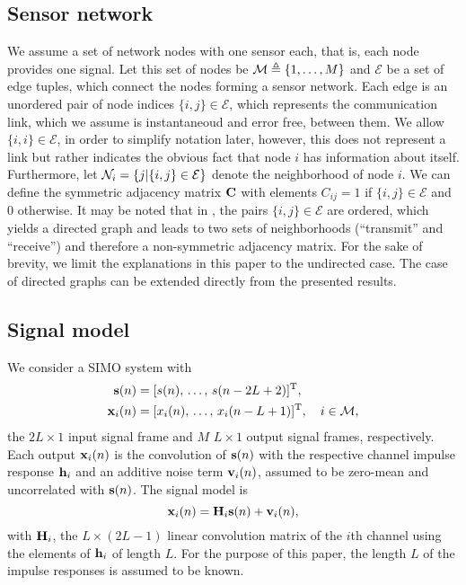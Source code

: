 \documentclass{article}
\begin{document}
\subsection[]{Sensor network}
We assume a set of network nodes with one sensor each, that is, each node provides one signal.
Let this set of nodes be \(\mathcal{M} \triangleq \{1,\ldots,M\}\) and \(\mathcal{E}\) be a set of edge tuples, which connect the nodes forming a sensor network.
Each edge is an unordered pair of node indices \(\{i,j\} \in \mathcal{E}\), which represents the communication link, which we assume is instantaneoud and error free, between them.
We allow \(\{i,i\} \in \mathcal{E}\), in order to simplify notation later, however, this does not represent a link but rather indicates the obvious fact that node \(i\) has information about itself.
Furthermore, let \(\mathcal{N}_i = \{j|\{i,j\} \in \mathcal{E}\}\) denote the neighborhood of node \(i\).
We can define the symmetric adjacency matrix \(\bm{\mathrm{C}}\) with elements \(C_{ij} = 1\) if \(\{i,j\} \in \mathcal{E}\) and 0 otherwise.
It may be noted that in \cite{blochbergerDBSI}, the pairs \(\{i,j\} \in \mathcal{E}\) are ordered, which yields a directed graph and leads to two sets of neighborhoods (``transmit'' and ``receive'') and therefore a non-symmetric adjacency matrix.
For the sake of brevity, we limit the explanations in this paper to the undirected case.
The case of directed graphs can be extended directly from the presented results.

\subsection[]{Signal model}
We consider a SIMO system with
\begin{align}
    \bm{\mathrm{s}}(n) &= [s(n),\,\ldots,\,s(n-2L+2)]^{{\mathrm{T}}},\\
    \bm{\mathrm{x}}_i(n) &= [x_i(n),\,\ldots,\,x_i(n-L+1)]^{{\mathrm{T}}}, \quad i \in \mathcal{M},
\end{align}
the \(2L \times 1\) input signal frame and \(M\) \(L \times 1\)  output signal frames, respectively.
Each output \(\bm{\mathrm{x}}_i(n)\) is the convolution of \(\bm{\mathrm{s}}(n)\) with the respective channel impulse response \(\bm{\mathrm{h}}_i\) and an additive noise term \(\bm{\mathrm{v}}_i(n)\), assumed to be zero-mean and uncorrelated with \(\bm{\mathrm{s}}(n)\).
The signal model is
\begin{equation}
    \bm{\mathrm{x}}_i(n) = \bm{\mathrm{H}}_i \bm{\mathrm{s}}(n) + \bm{\mathrm{v}}_i(n),
\end{equation}
with \(\bm{\mathrm{H}}_i\), the \(L \times (2L-1)\) linear convolution matrix of the \(i\)th channel using the elements of \(\bm{\mathrm{h}}_i\) of length \(L\).
For the purpose of this paper, the length \(L\) of the impulse responses is assumed to be known.
\end{document}
